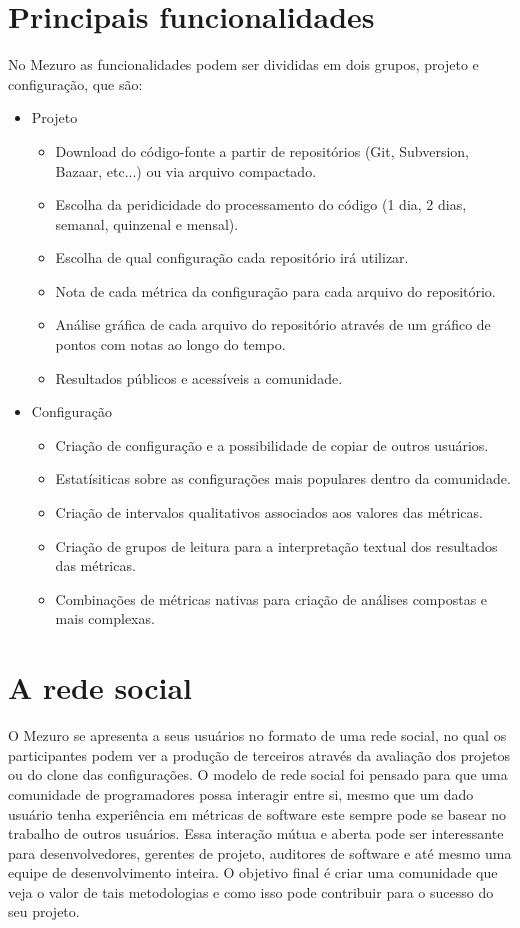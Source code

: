 \documentclass[12pt]{article}
\begin{document}
\section{Principais funcionalidades}\label{sec:princ-funcionalidades}
No Mezuro as funcionalidades podem ser divididas em dois grupos, projeto e configuração, que são:
\begin{itemize}
  \item Projeto
    \begin{itemize}
    \item Download do código-fonte a partir de repositórios (Git, Subversion, Bazaar, etc...) ou via arquivo compactado.
        \item Escolha da peridicidade do processamento do código (1 dia, 2 dias, semanal, quinzenal e mensal).
        \item Escolha de qual configuração cada repositório irá utilizar.
        \item Nota de cada métrica da configuração para cada arquivo do repositório.
        \item Análise gráfica de cada arquivo do repositório através de um gráfico de pontos com notas ao longo do tempo.
        \item Resultados públicos e acessíveis a comunidade.
    \end{itemize}
    \item Configuração
    \begin{itemize}
    \item Criação de configuração e a possibilidade de copiar de outros usuários.
        \item Estatísiticas sobre as configurações mais populares dentro da comunidade.
        \item Criação de intervalos qualitativos associados aos valores das métricas.
        \item Criação de grupos de leitura para a interpretação textual dos resultados das métricas.
        \item Combinações de métricas nativas para criação de análises compostas e mais complexas.
    \end{itemize}
\end{itemize}

\section{A rede social}\label{sec:user-potencial}
O Mezuro se apresenta a seus usuários no formato de uma rede social, no qual os participantes podem ver a produção de terceiros através da avaliação dos projetos ou do clone das configurações. O modelo de rede social foi pensado para que uma comunidade de programadores possa interagir entre si, mesmo que um dado usuário tenha experiência em métricas de software este sempre pode se basear no trabalho de outros usuários. Essa interação mútua e aberta pode ser interessante para desenvolvedores, gerentes de projeto, auditores de software e até mesmo uma equipe de desenvolvimento inteira. O objetivo final é criar uma comunidade que veja o valor de tais metodologias e como isso pode contribuir para o sucesso do seu projeto.
\newpage


\end{document}
